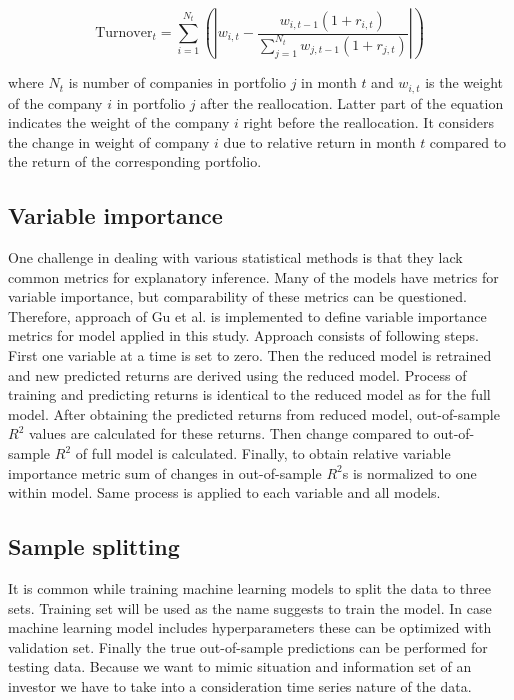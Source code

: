 \documentclass{article}
\begin{document}
\begin{equation}
\label{eq:Turnover}
\text{Turnover}_t = \sum_{i=1}^{N_t}  \left ( \left | w_{i, t} - \frac{w_{i, t-1}(1 + r_{i, t})}{ \sum_{j=1}^{N_{t}} w_{j, t-1}(1 + r_{j, t})} \right | \right )
\end{equation}

where $N_t$ is number of companies in portfolio $j$ in month $t$ and $w_{i, t}$ is the weight of the company $i$ in portfolio $j$ after the reallocation. Latter part of the equation indicates the weight of the company $i$ right before the reallocation. It considers the change in weight of company $i$ due to relative return in month $t$ compared to the return of the corresponding portfolio.

\subsection{Variable importance} \label{VariableImportance}

One challenge in dealing with various statistical methods is that they lack common metrics for explanatory inference. Many of the models have metrics for variable importance, but comparability of these metrics can be questioned. Therefore, approach of Gu et al. \citeyear{guetal} is implemented to define variable importance metrics for model applied in this study. Approach consists of following steps. First one variable at a time is set to zero. Then the reduced model is retrained and new predicted returns are derived using the reduced model. Process of training and predicting returns is identical to the reduced model as for the full model. After obtaining the predicted returns from reduced model, out-of-sample $R^2$ values are calculated for these returns. Then change compared to out-of-sample $R^2$ of full model is calculated. Finally, to obtain relative variable importance metric sum of changes in out-of-sample $R^2$s is normalized to one within model. Same process is applied to each variable and all models. \par

\subsection{Sample splitting} \label{SampleSplitting}

It is common while training machine learning models to split the data to three sets. Training set will be used as the name suggests to train the model. In case machine learning model includes hyperparameters these can be optimized with validation set. Finally the true out-of-sample predictions can be performed for testing data. Because we want to mimic situation and information set of an investor we have to take into a consideration time series nature of the data. \par
\end{document}
